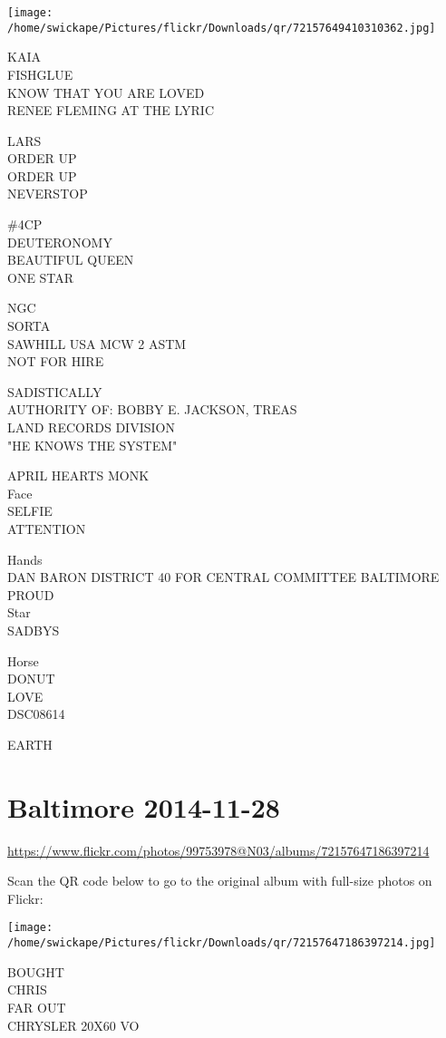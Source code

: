 \documentclass[10pt,letterpaper]{article}
\begin{document}
\texttt{[image: /home/swickape/Pictures/flickr/Downloads/qr/72157649410310362.jpg]}


KAIA\\
FISHGLUE\\
KNOW THAT YOU ARE LOVED\\
RENEE FLEMING AT THE LYRIC

LARS\\
ORDER UP\\
ORDER UP\\
NEVERSTOP

\#4CP\\
DEUTERONOMY\\
BEAUTIFUL QUEEN\\
ONE STAR

NGC\\
SORTA\\
SAWHILL USA MCW 2 ASTM\\
NOT FOR HIRE

SADISTICALLY\\
AUTHORITY OF: BOBBY E. JACKSON, TREAS\\
LAND RECORDS DIVISION\\
"HE KNOWS THE SYSTEM"

APRIL HEARTS MONK\\
Face\\
SELFIE\\
ATTENTION

Hands\\
DAN BARON DISTRICT 40 FOR CENTRAL COMMITTEE BALTIMORE PROUD\\
Star\\
SADBYS

Horse\\
DONUT\\
LOVE\\
DSC08614

EARTH


\section*{Baltimore 2014-11-28}

\url{https://www.flickr.com/photos/99753978@N03/albums/72157647186397214}

Scan the QR code below to go to the original album with full-size photos on Flickr:

\texttt{[image: /home/swickape/Pictures/flickr/Downloads/qr/72157647186397214.jpg]}


BOUGHT\\
CHRIS\\
FAR OUT\\
CHRYSLER 20X60 VO
\end{document}
